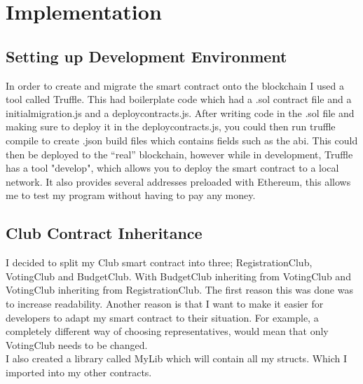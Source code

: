 \chapter{Implementation} \label{Chapter: Implementation}
\section{Setting up Development Environment}
In order to create and migrate the smart contract onto the blockchain I used a tool called Truffle. This had boilerplate code which had a .sol contract file and a initial\textunderscore migration.js and a deploy\textunderscore contracts.js. After writing code in the .sol file and making sure to deploy it in the deploy\textunderscore contracts.js, you could then run truffle compile to create .json build files which contains fields such as the abi. This could then be deployed to the “real” blockchain, however while in development, Truffle has a tool "develop", which allows you to deploy the smart contract to a local network. It also provides several addresses preloaded with Ethereum, this allows me to test my program without having to pay any money.  
\section{Club Contract Inheritance}
I decided to split my Club smart contract into three; RegistrationClub, VotingClub and BudgetClub. With BudgetClub inheriting from VotingClub and VotingClub inheriting from RegistrationClub. The first reason this was done was to increase readability. Another reason is that I want to make it easier for developers to adapt my smart contract to their situation. For example, a completely different way of choosing representatives, would mean that only VotingClub needs to be changed. 
\\
I also created a library called MyLib which will contain all my structs. Which I imported into my other contracts.
